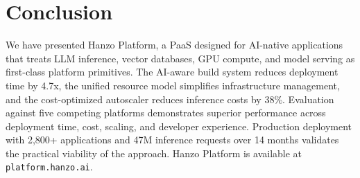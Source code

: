 \section{Conclusion}

\label{sec:conclusion}

We have presented Hanzo Platform, a PaaS designed for AI-native applications that treats LLM inference, vector databases, GPU compute, and model serving as first-class platform primitives. The AI-aware build system reduces deployment time by 4.7x, the unified resource model simplifies infrastructure management, and the cost-optimized autoscaler reduces inference costs by 38\%. Evaluation against five competing platforms demonstrates superior performance across deployment time, cost, scaling, and developer experience. Production deployment with 2,800+ applications and 47M inference requests over 14 months validates the practical viability of the approach. Hanzo Platform is available at \texttt{platform.hanzo.ai}.

